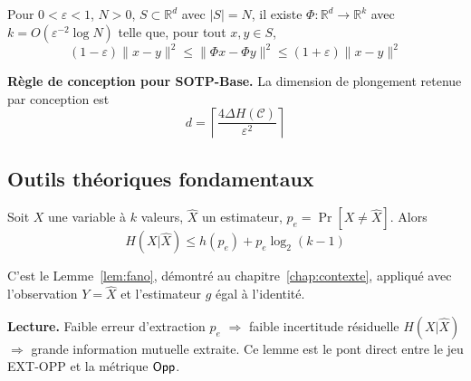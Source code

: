 \begin{sloppypar}
\begin{definition}\label{def:ann_jl}
Pour $0 < \varepsilon < 1$, $N > 0$, $S \subset \mathbb{R}^d$ avec
$|S| = N$, il existe $\Phi\colon \mathbb{R}^d \to \mathbb{R}^k$ avec
$k = O(\varepsilon^{-2} \log N)$ telle que, pour tout $x,y \in S$,
\begin{equation}
(1-\varepsilon)\|x-y\|^2 \leq \|\Phi x-\Phi y\|^2 \leq (1+\varepsilon)\|x-y\|^2
\end{equation}
\end{definition}

\noindent\textbf{R\`egle de conception pour SOTP-Base.}
La dimension de plongement retenue par conception est
\begin{equation}
d = \left\lceil \frac{4\Delta H(\mathcal{C})}{\varepsilon^2} \right\rceil
\label{eq:ann_jl_dim}
\end{equation}

\subsection{Outils th\'eoriques fondamentaux}

\begin{lemma}\label{lem:ann_g_fano}
Soit $X$ une variable à $k$ valeurs, $\hat{X}$ un estimateur,
$p_e = \Pr[X \neq \hat{X}]$. Alors
\begin{equation}
H(X|\hat{X}) \leq h(p_e) + p_e \log_2(k-1)
\end{equation}
\end{lemma}

\begin{Preuve}
C'est le Lemme~\ref{lem:fano}, d\'emontr\'e au chapitre~\ref{chap:contexte}, appliqu\'e
avec l'observation $Y = \hat X$ et l'estimateur $g$ \'egal \`a l'identit\'e.
\end{Preuve}

\noindent\textbf{Lecture.} Faible erreur d'extraction $p_e$
$\Rightarrow$ faible incertitude r\'esiduelle $H(X|\hat{X})$
$\Rightarrow$ grande information mutuelle extraite. Ce lemme est le
pont direct entre le jeu EXT-OPP et la m\'etrique $\mathsf{Opp}$.


\end{sloppypar}
